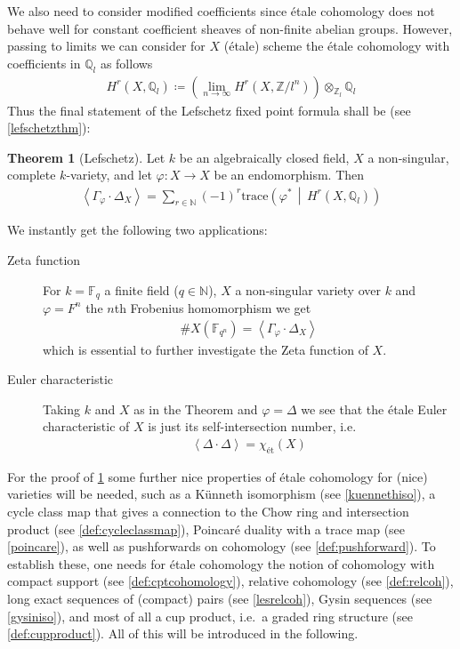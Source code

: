 \documentclass[english,headsepline=0.25pt]{scrartcl}
\theoremstyle{definition}
\newtheorem{Thm}[Def]{Theorem}
\theoremstyle{remark}
\newcommand*{\N}{\mathds{N}}
\newcommand*{\Z}{\mathds{Z}}
\newcommand*{\Q}{\mathds{Q}}
\newcommand*{\fF}{\mathds{F}} %
\newcommand*{\Zmod}[1]{\Z/#1} %
\newcommand*{\Zl}{\Z_l} %
\newcommand*{\Ql}{\Q_l} %
\newcommand*{\idest}{i.e.\ }
\newcommand*{\intProd}[2]{{#1\cdot#2}} %
\newcommand*{\intNum}[1]{{\left\langle{#1}\right\rangle}} %
\newcommand*{\Graph}[1]{{\Gamma_{#1}}} %
\newcommand*{\Diag}[1]{{\Delta_{#1}}} %
\newcommand*{\trace}[2]{{\text{trace}\left(#1 \,\middle|\, #2 \right)}} %
\renewcommand*{\phi}{\varphi}
\begin{document}
We also need to consider modified coefficients since étale cohomology
does not behave well for constant coefficient sheaves of non-finite
abelian groups. However, passing to limits we can consider for $X$
(étale) scheme the étale cohomology with coefficients in $\Ql$ as follows
\begin{gather*}
  H^r(X,\Ql)\coloneqq
  \left(\lim_{n\to\infty}H^r(X,\Zmod{l^n})\right)\otimes_{\Zl}\Ql
\end{gather*}
Thus the final statement of the Lefschetz fixed point formula shall be
(see \ref{lefschetzthm}):
\begin{Thm}[Lefschetz]\label{lefschetzthm:motivation}
  Let $k$ be an algebraically closed field, $X$ a non-singular,
  complete $k$-variety, and let $\phi\colon X\to X$ be an
  endomorphism. Then
  \begin{gather*}
    \intNum{\intProd{\Graph{\phi}}{\Diag{X}}}
    = \sum_{r\in\N}(-1)^r\trace{\phi^*}{H^r(X,\Ql)}
  \end{gather*}
\end{Thm}

We instantly get the following two applications:
\begin{description}
\item[Zeta function] For
  $k=\fF_{q}$ a finite field ($q\in\N$),
  $X$ a non-singular variety over $k$ and
  $\phi=F^n$ the $n$th Frobenius homomorphism
  we get
  \begin{gather*}
    \#X(\fF_{q^n}) = \intNum{\intProd{\Graph\phi}{\Diag X}}
  \end{gather*}
  which is essential to further investigate the Zeta function of $X$.
\item[Euler characteristic] Taking $k$ and $X$ as in the Theorem and
  $\phi=\Delta$ we see that the étale Euler characteristic of $X$ is
  just its self-intersection number, \idest
  \begin{gather*}
    \intNum{\intProd{\Delta}{\Delta}} = \chi_{\text{ét}}(X)
  \end{gather*}
\end{description}

For the proof of \ref{lefschetzthm:motivation}
some further nice properties of étale cohomology for
(nice) varieties will be needed, such as
a Künneth isomorphism (see \ref{kuennethiso}),
a cycle class map that gives a connection to the Chow ring and
intersection product (see \ref{def:cycleclassmap}),
Poincaré duality with a trace map (see \ref{poincare}),
as well as pushforwards on cohomology (see \ref{def:pushforward}).
To establish these, one needs for étale cohomology the notion of
cohomology with compact support (see \ref{def:cptcohomology}),
relative cohomology (see \ref{def:relcoh}),
long exact sequences of (compact) pairs (see \ref{lesrelcoh}),
Gysin sequences (see \ref{gysiniso}),
and most of all a cup product, \idest a graded ring structure
(see \ref{def:cupproduct}).
All of this will be introduced in the following.
\end{document}
